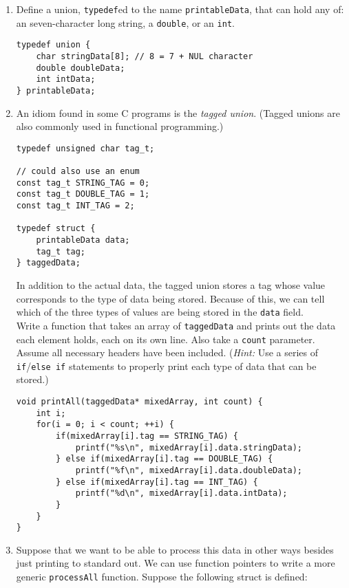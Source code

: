 \begin{enumerate}

\item Define a union, \texttt{typedef}ed to the name \texttt{printableData}, that can hold any of: an seven-character long string, a \texttt{double}, or an \texttt{int}.

\begin{answer}
\begin{verbatim}
typedef union {
    char stringData[8]; // 8 = 7 + NUL character
    double doubleData;
    int intData;
} printableData;
\end{verbatim}
\end{answer}

\item An idiom found in some C programs is the \textit{tagged union}. (Tagged unions are also commonly used in functional programming.)

\begin{verbatim}
typedef unsigned char tag_t;

// could also use an enum
const tag_t STRING_TAG = 0;
const tag_t DOUBLE_TAG = 1;
const tag_t INT_TAG = 2;

typedef struct {
    printableData data;
    tag_t tag;
} taggedData;
\end{verbatim}

In addition to the actual data, the tagged union stores a tag whose value corresponds to the type of data being stored. Because of this, we can tell which of the three types of values are being stored in the \texttt{data} field.\\
Write a function that takes an array of \texttt{taggedData} and prints out the data each element holds, each on its own line. Also take a \texttt{count} parameter. Assume all necessary headers have been included. (\textit{Hint:} Use a series of \texttt{if}/\texttt{else if} statements to properly print each type of data that can be stored.)

\begin{answer}
\begin{verbatim}
void printAll(taggedData* mixedArray, int count) {
    int i;
    for(i = 0; i < count; ++i) {
        if(mixedArray[i].tag == STRING_TAG) {
            printf("%s\n", mixedArray[i].data.stringData);
        } else if(mixedArray[i].tag == DOUBLE_TAG) {
            printf("%f\n", mixedArray[i].data.doubleData);
        } else if(mixedArray[i].tag == INT_TAG) {
            printf("%d\n", mixedArray[i].data.intData);
        }
    }
}
\end{verbatim}
\end{answer}
\newpage
\item Suppose that we want to be able to process this data in other ways besides just printing to standard out. We can use function pointers to write a more generic \texttt{processAll} function. Suppose the following struct is defined:


\end{enumerate}
